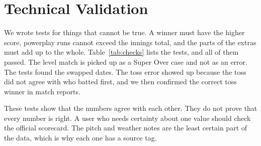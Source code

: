 \section{Technical Validation}
\label{sec:validation}
We wrote tests for things that cannot be true. A winner must have the higher score, powerplay runs cannot exceed the innings total, and the parts of the extras must add up to the whole. Table~\ref{tab:checks} lists the tests, and all of them passed. The level match is picked up as a Super Over case and not as an error. The tests found the swapped dates. The toss error showed up because the toss did not agree with who batted first, and we then confirmed the correct toss winner in match reports.



These tests show that the numbers agree with each other. They do not prove that every number is right. A user who needs certainty about one value should check the official scorecard. The pitch and weather notes are the least certain part of the data, which is why each one has a source tag.
